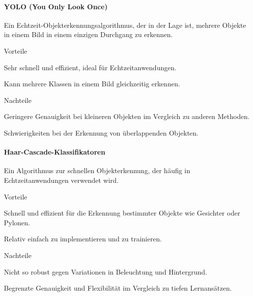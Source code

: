 \paragraph{YOLO (You Only Look Once)}

Ein Echtzeit-Objekterkennungsalgorithmus, der in der Lage ist, mehrere Objekte in einem Bild in einem einzigen Durchgang zu erkennen.

\begin{minipage}[t]{0.48\textwidth}
\begin{items}
  \item [Vorteile]
  \item Sehr schnell und effizient, ideal für Echtzeitanwendungen.
  \item Kann mehrere Klassen in einem Bild gleichzeitig erkennen.
\end{items}
\end{minipage}
\hfill
\begin{minipage}[t]{0.48\textwidth}
\begin{items}
  \item [Nachteile]
  \item Geringere Genauigkeit bei kleineren Objekten im Vergleich zu anderen Methoden.
  \item Schwierigkeiten bei der Erkennung von überlappenden Objekten.
\end{items}
\end{minipage}

\paragraph{Haar-Cascade-Klassifikatoren}

Ein Algorithmus zur schnellen Objekterkennung, der häufig in Echtzeitanwendungen verwendet wird.

\begin{minipage}[t]{0.48\textwidth}
\begin{items}
  \item [Vorteile]
  \item Schnell und effizient für die Erkennung bestimmter Objekte wie Gesichter oder Pylonen.
  \item Relativ einfach zu implementieren und zu trainieren.
\end{items}
\end{minipage}
\hfill
\begin{minipage}[t]{0.48\textwidth}
\begin{items}
  \item [Nachteile]
  \item Nicht so robust gegen Variationen in Beleuchtung und Hintergrund.
  \item Begrenzte Genauigkeit und Flexibilität im Vergleich zu tiefen Lernansätzen.
\end{items}
\end{minipage}

